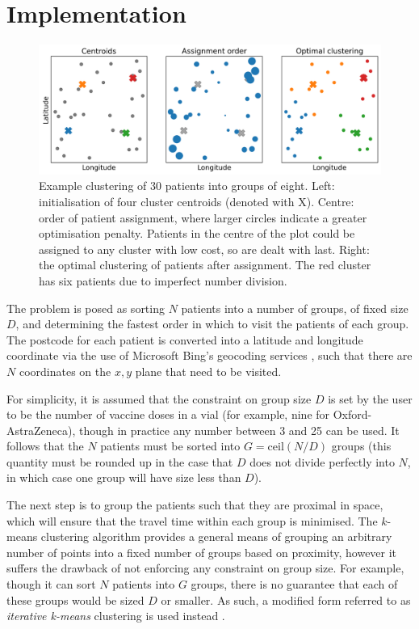 \documentclass[11pt]{amsart}
\begin{document}
\section{Implementation}

\begin{figure}[htbp]
\centering
\includegraphics[width=\textwidth]{clustering_demo.png}
\caption{Example clustering of 30 patients into groups of eight. Left: initialisation of four cluster centroids (denoted with X). Centre: order of patient assignment, where larger circles indicate a greater optimisation penalty. Patients in the centre of the plot could be assigned to any cluster with low cost, so are dealt with last. Right: the optimal clustering of patients after assignment. The red cluster has six patients due to imperfect number division.}
\label{default}
\end{figure}


The problem is posed as sorting $N$ patients into a number of groups, of fixed size $D$, and determining the fastest order in which to visit the patients of each group. The postcode for each patient is converted into a latitude and longitude coordinate via the use of Microsoft Bing’s geocoding services \cite{X}, such that there are $N$ coordinates on the $x,y$ plane that need to be visited. 

For simplicity, it is assumed that the constraint on group size $D$ is set by the user to be the number of vaccine doses in a vial (for example, nine for Oxford-AstraZeneca), though in practice any number between 3 and 25 can be used. It follows that the $N$ patients must be sorted into $G = \mathrm{ceil}(N / D)$ groups (this quantity must be rounded up in the case that $D$ does not divide perfectly into $N$, in which case one group will have size less than $D$). 

The next step is to group the patients such that they are proximal in space, which will ensure that the travel time within each group is minimised. The $k$-means clustering algorithm \cite{X} provides a general means of grouping an arbitrary number of points into a fixed number of groups based on proximity, however it suffers the drawback of not enforcing any constraint on group size. For example, though it can sort $N$ patients into $G$ groups, there is no guarantee that each of these groups would be sized $D$ or smaller. As such, a modified form referred to as \textit{iterative k-means} clustering is used instead \cite{X}. 
\end{document}

